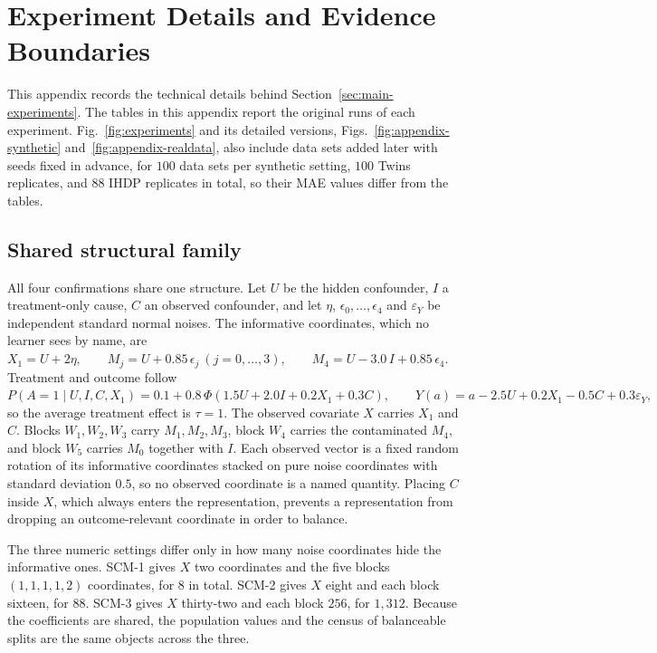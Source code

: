 \section{Experiment Details and Evidence Boundaries}
\label{sec:appendix-experiments}

This appendix records the technical details behind Section~\ref{sec:main-experiments}. The tables in this appendix report the original runs of each experiment. Fig.~\ref{fig:experiments} and its detailed versions, Figs.~\ref{fig:appendix-synthetic} and~\ref{fig:appendix-realdata}, also include data sets added later with seeds fixed in advance, for $100$ data sets per synthetic setting, $100$ Twins replicates, and $88$ IHDP replicates in total, so their MAE values differ from the tables.

\subsection{Shared structural family}

All four confirmations share one structure. Let $U$ be the hidden confounder, $I$ a treatment-only cause, $C$ an observed confounder, and let $\eta$, $\epsilon_0,\ldots,\epsilon_4$ and $\varepsilon_Y$ be independent standard normal noises. The informative coordinates, which no learner sees by name, are
\(X_1=U+2\eta,\qquad M_j=U+0.85\,\epsilon_j\ (j=0,\ldots,3),\qquad M_4=U-3.0\,I+0.85\,\epsilon_4.\)
Treatment and outcome follow
\(P(A=1\mid U,I,C,X_1)=0.1+0.8\,\Phi(1.5U+2.0I+0.2X_1+0.3C),\qquad Y(a)=a-2.5U+0.2X_1-0.5C+0.3\varepsilon_Y,\)
so the average treatment effect is $\tau=1$. The observed covariate $X$ carries $X_1$ and $C$. Blocks $W_1,W_2,W_3$ carry $M_1,M_2,M_3$, block $W_4$ carries the contaminated $M_4$, and block $W_5$ carries $M_0$ together with $I$. Each observed vector is a fixed random rotation of its informative coordinates stacked on pure noise coordinates with standard deviation $0.5$, so no observed coordinate is a named quantity. Placing $C$ inside $X$, which always enters the representation, prevents a representation from dropping an outcome-relevant coordinate in order to balance.

The three numeric settings differ only in how many noise coordinates hide the informative ones. SCM-1 gives $X$ two coordinates and the five blocks $(1,1,1,1,2)$ coordinates, for $8$ in total. SCM-2 gives $X$ eight and each block sixteen, for $88$. SCM-3 gives $X$ thirty-two and each block $256$, for $1{,}312$. Because the coefficients are shared, the population values and the census of balanceable splits are the same objects across the three.

